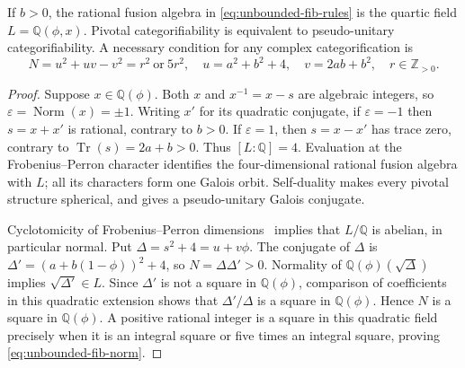 \begin{lemma}\label{lem:unbounded-fib-field}
If $b>0$, the rational fusion algebra in
\eqref{eq:unbounded-fib-rules} is the quartic field
$L=\mathbb Q(\phi,x)$. Pivotal categorifiability is equivalent to
pseudo-unitary categorifiability. A necessary condition for any complex
categorification is
\begin{equation}\label{eq:unbounded-fib-norm}
 N=u^2+uv-v^2=r^2\ \text{or}\ 5r^2,
 \quad u=a^2+b^2+4,\quad v=2ab+b^2,
 \quad r\in\mathbb Z_{>0}.
\end{equation}
\end{lemma}
\begin{proof}
Suppose $x\in\mathbb Q(\phi)$. Both $x$ and $x^{-1}=x-s$ are
algebraic integers, so $\varepsilon=\operatorname{Norm}(x)=\pm1$.
Writing $x'$ for its quadratic conjugate, if $\varepsilon=-1$ then
$s=x+x'$ is rational, contrary to $b>0$. If $\varepsilon=1$, then
$s=x-x'$ has trace zero, contrary to
$\operatorname{Tr}(s)=2a+b>0$. Thus $[L:\mathbb Q]=4$.
Evaluation at the Frobenius--Perron character identifies the
four-dimensional rational fusion algebra with $L$; all its characters
form one Galois orbit. Self-duality makes every pivotal structure
spherical, and \cite[Lemma~\ref{B-lem:galois}]{Finite} gives a pseudo-unitary Galois
conjugate.

Cyclotomicity of Frobenius--Perron dimensions~\cite{ENO} implies that
$L/\mathbb Q$ is abelian, in particular normal. Put
$\Delta=s^2+4=u+v\phi$. The conjugate of $\Delta$ is
$\Delta'=(a+b(1-\phi))^2+4$, so $N=\Delta\Delta'>0$.
Normality of $\mathbb Q(\phi)(\sqrt\Delta)$ implies
$\sqrt{\Delta'}\in L$. Since $\Delta'$ is not a square in
$\mathbb Q(\phi)$, comparison of coefficients in this quadratic
extension shows that $\Delta'/\Delta$ is a square in $\mathbb Q(\phi)$.
Hence $N$ is a square in $\mathbb Q(\phi)$.
A positive rational integer is a square in this quadratic field
precisely when it is an integral square or five times an integral
square, proving \eqref{eq:unbounded-fib-norm}.
\end{proof}

